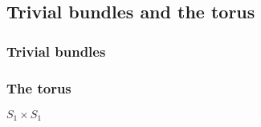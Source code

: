 
\subsection{Trivial bundles and the torus}

\subsubsection{Trivial bundles}

\subsubsection{The torus}

\(S_1 \times S_1\)

